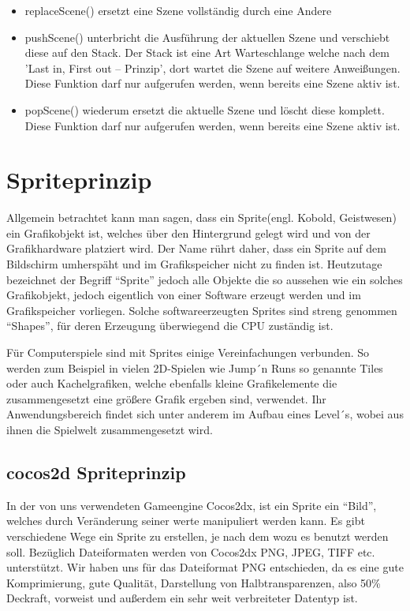 \begin{itemize}
\item replaceScene() ersetzt eine Szene vollständig durch eine Andere
\item pushScene() unterbricht die Ausführung der aktuellen Szene und verschiebt diese auf den Stack. Der Stack ist eine Art Warteschlange welche nach dem 'Last in, First out – Prinzip', dort wartet die Szene auf weitere Anweißungen. Diese Funktion darf nur aufgerufen werden, wenn bereits eine Szene aktiv ist.
\item popScene() wiederum ersetzt die aktuelle Szene und löscht diese komplett. Diese Funktion darf nur aufgerufen werden, wenn bereits eine Szene aktiv ist.
\end{itemize}



\section{Spriteprinzip}\label{sec:2_Spriteprinzip}
Allgemein betrachtet kann man sagen, dass ein Sprite(engl. Kobold, Geistwesen) ein Grafikobjekt ist, welches über den Hintergrund gelegt wird und von der Grafikhardware platziert wird. 
Der Name rührt daher, dass ein Sprite auf dem Bildschirm umherspäht und im Grafikspeicher nicht zu finden ist. Heutzutage bezeichnet der Begriff “Sprite” jedoch alle Objekte die so aussehen wie ein solches Grafikobjekt, jedoch eigentlich von einer Software erzeugt werden und im Grafikspeicher vorliegen. 
Solche softwareerzeugten Sprites sind streng genommen “Shapes”, für deren Erzeugung überwiegend die CPU zuständig ist.
 
Für Computerspiele sind mit Sprites einige Vereinfachungen verbunden. So werden zum Beispiel in vielen 2D-Spielen wie Jump´n Runs so genannte Tiles oder auch Kachelgrafiken, welche ebenfalls kleine Grafikelemente die zusammengesetzt eine größere Grafik ergeben sind, verwendet. Ihr Anwendungsbereich findet sich unter anderem im Aufbau eines Level´s, wobei aus ihnen die Spielwelt zusammengesetzt wird.

\subsection{cocos2d Spriteprinzip}
In der von uns verwendeten Gameengine Cocos2dx, ist ein Sprite ein “Bild”, welches durch Veränderung seiner werte manipuliert werden kann. Es gibt verschiedene Wege ein Sprite zu erstellen, je nach dem wozu es benutzt werden soll. Bezüglich Dateiformaten werden von Cocos2dx PNG, JPEG, TIFF etc. unterstützt. Wir haben uns für das Dateiformat PNG entschieden, da es eine gute Komprimierung, gute Qualität, Darstellung von Halbtransparenzen, also 50\% Deckraft, vorweist und außerdem ein sehr weit verbreiteter Datentyp ist.

